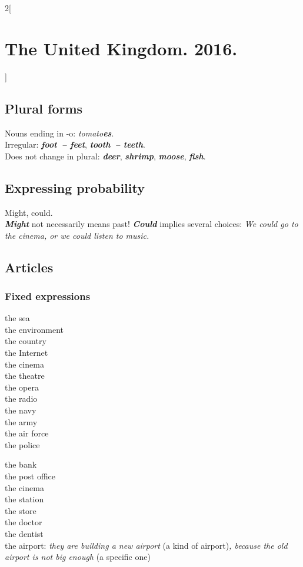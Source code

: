 \documentclass[10pt,a4paper]{article}
\newcommand\ex[1]{\textit{\textbf{{#1}}}}           %
\begin{document}
\begin{multicols}{2}[\section{The United Kingdom. 2016.}]
\subsection{Plural forms}
Nouns ending in -o: \textit{tomato\ex{es}}.\\
Irregular: \ex{foot~-- feet}, \ex{tooth~-- teeth}.\\
Does not change in plural: \ex{deer}, \ex{shrimp}, \ex{moose}, \ex{fish}.




\subsection{Expressing probability}
Might, could.\\
\ex{Might} not necessarily means past! \ex{Could} implies several choices: \textit{We could go to the cinema, or we could listen to music.}






\subsection{Articles}

\subsubsection{Fixed expressions}

\begin{minipage}{0.32\linewidth}
the sea\\
the environment\\
the country\\
the Internet\\
the cinema\\
the theatre\\
the opera\\
the radio\\
the navy\\
the army\\
the air force\\
the police
\end{minipage}
\begin{minipage}{0.65\linewidth}
the bank\\
the post office\\
the cinema\\
the station\\
the store\\
the doctor\\
the dentist\\
the airport: \textit{they are building a new airport} (a kind of airport)\textit{, because the
old airport is not big enough} (a specific one)
\end{minipage}


\end{multicols}
\end{document}
